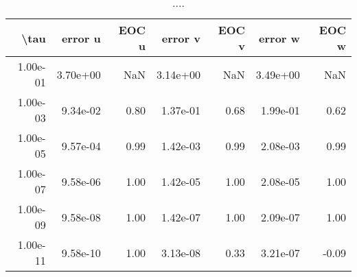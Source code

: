 \begin{table}[ht]
\centering
\begin{tabular}{rrrrrrr}
  \hline
  \textbf{\textbackslash{}tau} & \textbf{error u} & \textbf{EOC u} & \textbf{error v} & \textbf{EOC v} & \textbf{error w} & \textbf{EOC w} \\\hline
  1.00e-01 & 3.70e+00 & NaN & 3.14e+00 & NaN & 3.49e+00 & NaN \\
  1.00e-03 & 9.34e-02 & 0.80 & 1.37e-01 & 0.68 & 1.99e-01 & 0.62 \\
  1.00e-05 & 9.57e-04 & 0.99 & 1.42e-03 & 0.99 & 2.08e-03 & 0.99 \\
  1.00e-07 & 9.58e-06 & 1.00 & 1.42e-05 & 1.00 & 2.08e-05 & 1.00 \\
  1.00e-09 & 9.58e-08 & 1.00 & 1.42e-07 & 1.00 & 2.09e-07 & 1.00 \\
  1.00e-11 & 9.58e-10 & 1.00 & 3.13e-08 & 0.33 & 3.21e-07 & -0.09 \\\hline
\end{tabular}
\caption{....}
\end{table}
